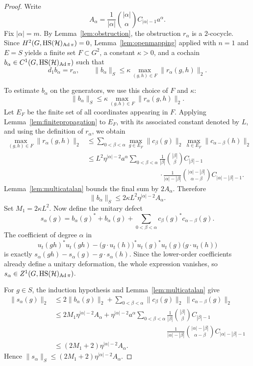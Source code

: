 \documentclass[12pt]{amsproc}
\theoremstyle{plain}
\theoremstyle{definition}
\numberwithin{equation}{section}
\newcommand{\HS}{{\rm HS}}
\DeclareMathOperator{\Ad}{Ad}
\begin{document}
\begin{proof}
Write
\[
A_\alpha=\frac{1}{|\alpha|}\binom{|\alpha|}{\alpha}C_{|\alpha|-1}a^\alpha.
\]
Fix $|\alpha|=m$. By Lemma~\ref{lem:obstruction}, the obstruction $r_\alpha$ is a $2$-cocycle. Since $H^2(G,\HS(\mathcal H)_{\Ad\pi})=0$, Lemma~\ref{lem:openmapping} applied with $n=1$ and $E=S$ yields a finite set $F\subset G^2$, a constant $\kappa>0$, and a cochain $b_\alpha\in C^1(G,\HS(\mathcal H)_{\Ad\pi})$ such that
\[
d_1b_\alpha=r_\alpha,
\qquad
\|b_\alpha\|_S\le \kappa\max_{(g,h)\in F}\|r_\alpha(g,h)\|_2.
\]

To estimate $b_\alpha$ on the generators, we use this choice of $F$ and $\kappa$:
\[
\|b_\alpha\|_S\le \kappa\max_{(g,h)\in F}\|r_\alpha(g,h)\|_2.
\]
Let $E_F$ be the finite set of all coordinates appearing in $F$. Applying Lemma~\ref{lem:finitepropagation} to $E_F$, with its associated constant denoted by $L$, and using the definition of $r_\alpha$, we obtain
\begin{align*}
\max_{(g,h)\in F}\|r_\alpha(g,h)\|_2
&\le \sum_{0<\beta<\alpha}
\max_{g\in E_F}\|c_\beta(g)\|_2\,
\max_{h\in E_F}\|c_{\alpha-\beta}(h)\|_2\\
&\le L^2 \eta^{|\alpha|-2}a^\alpha
\sum_{0<\beta<\alpha}
\frac{1}{|\beta|}\binom{|\beta|}{\beta}C_{|\beta|-1}
\\
&\phantom{\le L^2 \eta^{|\alpha|-2}a^\alpha\sum_{0<\beta<\alpha}}
\cdot
\frac{1}{|\alpha|-|\beta|}\binom{|\alpha|-|\beta|}{\alpha-\beta}C_{|\alpha|-|\beta|-1}.
\end{align*}
Lemma~\ref{lem:multicatalan} bounds the final sum by
$
2A_\alpha.
$
Therefore
\[
\|b_\alpha\|_S\le 2\kappa L^2 \eta^{|\alpha|-2}A_\alpha.
\]
Set $M_1=2\kappa L^2$.
Now define the unitary defect
\[
s_\alpha(g)=b_\alpha(g)^*+b_\alpha(g)+\sum_{0<\beta<\alpha}c_\beta(g)^*c_{\alpha-\beta}(g).
\]
The coefficient of degree $\alpha$ in
\[
u_t(gh)^*u_t(gh)-\bigl(g\cdot u_t(h)\bigr)^*u_t(g)^*u_t(g)\bigl(g\cdot u_t(h)\bigr)
\]
is exactly
$
s_\alpha(gh)-s_\alpha(g)-g\cdot s_\alpha(h).
$
Since the lower-order coefficients already define a unitary deformation, the whole expression vanishes, so $s_\alpha\in Z^1(G,\HS(\mathcal H)_{\Ad\pi})$.

For $g\in S$, the induction hypothesis and Lemma~\ref{lem:multicatalan} give
\begin{align*}
\|s_\alpha(g)\|_2
&\le 2\|b_\alpha(g)\|_2+\sum_{0<\beta<\alpha}\|c_\beta(g)\|_2\,\|c_{\alpha-\beta}(g)\|_2\\
&\le 2M_1 \eta^{|\alpha|-2}A_\alpha
+\eta^{|\alpha|-2}a^\alpha
\sum_{0<\beta<\alpha}
\frac{1}{|\beta|}\binom{|\beta|}{\beta}C_{|\beta|-1}
\\
&\phantom{\le 2M_1 \eta^{|\alpha|-2}A_\alpha
+\eta^{|\alpha|-2}a^\alpha\sum_{0<\beta<\alpha}}
\frac{1}{|\alpha|-|\beta|}\binom{|\alpha|-|\beta|}{\alpha-\beta}C_{|\alpha|-|\beta|-1}\\
&\le (2M_1+2)\eta^{|\alpha|-2}A_\alpha.
\end{align*}
Hence
$
\|s_\alpha\|_S\le (2M_1+2)\eta^{|\alpha|-2}A_\alpha.
$


\end{proof}
\end{document}
